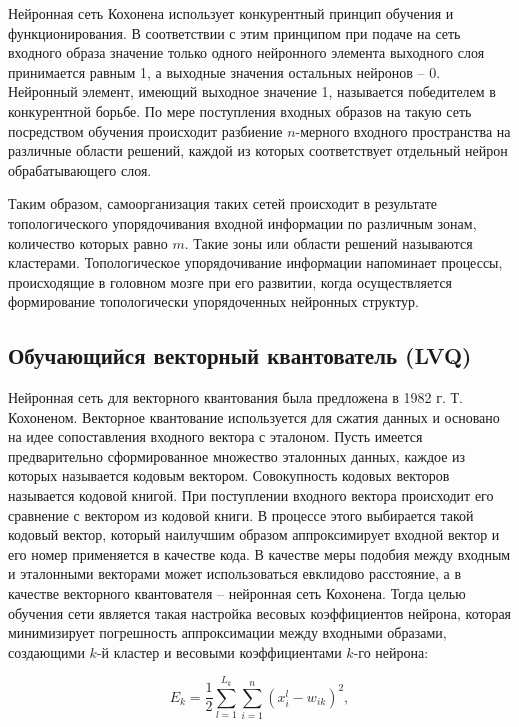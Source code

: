 \documentclass[bachelor, och, referat]{template}
\begin{document}
Нейронная сеть Кохонена использует конкурентный принцип обучения 
и функционирования. В соответствии с этим принципом при подаче 
на сеть входного образа значение только одного нейронного элемента 
выходного слоя принимается равным 1, а выходные значения остальных 
нейронов -- 0. Нейронный элемент, имеющий выходное значение 1, 
называется победителем в конкурентной борьбе. По мере поступления 
входных образов на такую сеть посредством обучения происходит 
разбиение $n$-мерного входного пространства на различные области 
решений, каждой из которых соответствует отдельный нейрон 
обрабатывающего слоя.

Таким образом, самоорганизация таких сетей происходит в результате 
топологического упорядочивания входной информации по различным
зонам, количество которых равно $m$. Такие зоны или области решений
называются кластерами. Топологическое упорядочивание информации
напоминает процессы, происходящие в головном мозге при его развитии, 
когда осуществляется формирование топологически упорядоченных
нейронных структур.

\subsection{Обучающийся векторный квантователь (LVQ)}

Нейронная сеть для векторного квантования была предложена в
1982 г. Т. Кохоненом. Векторное квантование используется для
сжатия данных и основано на идее сопоставления входного вектора с
эталоном. Пусть имеется предварительно сформированное множество 
эталонных данных, каждое из которых называется кодовым вектором. 
Совокупность кодовых векторов называется кодовой книгой. При
поступлении входного вектора происходит его сравнение с вектором из
кодовой книги. В процессе этого выбирается такой кодовый вектор,
который наилучшим образом аппроксимирует входной вектор и его
номер применяется в качестве кода. В качестве меры подобия
между входным и эталонными векторами может использоваться евклидово 
расстояние, а в качестве векторного квантователя -- нейронная
сеть Кохонена. Тогда целью обучения сети является такая настройка
весовых коэффициентов нейрона, которая минимизирует погрешность
аппроксимации между входными образами, создающими $k$-й кластер и
весовыми коэффициентами $k$-го нейрона:

\begin{equation}
    E_k = \frac{1}{2} \sum_{l = 1}^{L_k} \sum_{i = 1}^{n} (x_i^l - w_{ik})^2,
\end{equation}
\end{document}

